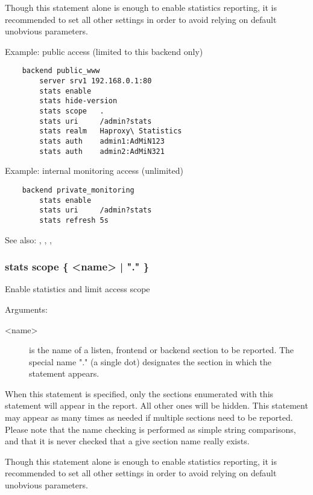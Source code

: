   Though this statement alone is enough to enable statistics reporting, it is
  recommended to set all other settings in order to avoid relying on default
  unobvious parameters.

  Example: public access (limited to this backend only)
  \begin{verbatim}
    backend public_www
        server srv1 192.168.0.1:80
        stats enable
        stats hide-version
        stats scope   .
        stats uri     /admin?stats
        stats realm   Haproxy\ Statistics
        stats auth    admin1:AdMiN123
        stats auth    admin2:AdMiN321
   \end{verbatim}

   Example: internal monitoring access (unlimited)
   \begin{verbatim}
    backend private_monitoring
        stats enable
        stats uri     /admin?stats
        stats refresh 5s
   \end{verbatim}

  See also: , , , 

\subsubsection[stats scope]{stats scope \{ <name> | "." \}}


  Enable statistics and limit access scope


  Arguments:
  \begin{description}
  \item[<name>] is the name of a listen, frontend or backend section to be
              reported. The special name "." (a single dot) designates the
              section in which the statement appears.
  \end{description}

  When this statement is specified, only the sections enumerated with this
  statement will appear in the report. All other ones will be hidden. This
  statement may appear as many times as needed if multiple sections need to be
  reported. Please note that the name checking is performed as simple string
  comparisons, and that it is never checked that a give section name really
  exists.

  Though this statement alone is enough to enable statistics reporting, it is
  recommended to set all other settings in order to avoid relying on default
  unobvious parameters.

